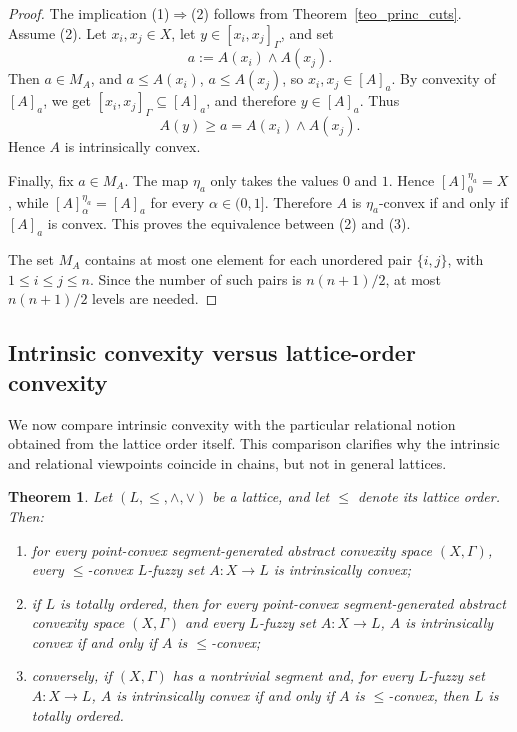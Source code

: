 \documentclass[11pt,a4paper]{article}
\newtheorem{theorem}{Theorem}
\begin{document}
\begin{proof}
The implication (1)\(\Rightarrow\)(2) follows from Theorem~\ref{teo_princ_cuts}. Assume (2). Let \(x_i,x_j\in X\), let \(y\in[x_i,x_j]_{\Gamma}\), and set
\begin{equation*}
a:=A(x_i)\wedge A(x_j).
\end{equation*}
Then \(a\in M_A\), and \(a\le A(x_i)\), \(a\le A(x_j)\), so \(x_i,x_j\in[A]_a\). By convexity of \([A]_a\), we get \([x_i,x_j]_{\Gamma}\subseteq[A]_a\), and therefore \(y\in[A]_a\). Thus
\begin{equation*}
A(y)\ge a=A(x_i)\wedge A(x_j).
\end{equation*}
Hence \(A\) is intrinsically convex.

Finally, fix \(a\in M_A\). The map \(\eta_a\) only takes the values \(0\) and \(1\). Hence \([A]^{\eta_a}_0=X\), while \([A]^{\eta_a}_\alpha=[A]_a\) for every \(\alpha\in(0,1]\). Therefore \(A\) is \(\eta_a\)-convex if and only if \([A]_a\) is convex. This proves the equivalence between (2) and (3).

The set \(M_A\) contains at most one element for each unordered pair \(\{i,j\}\), with \(1\le i\le j\le n\). Since the number of such pairs is \(n(n+1)/2\), at most \(n(n+1)/2\) levels are needed.
\end{proof}

\subsection{Intrinsic convexity versus lattice-order convexity}

\smallskip

We now compare intrinsic convexity with the particular relational notion obtained from the lattice order itself. This comparison clarifies why the intrinsic and relational viewpoints coincide in chains, but not in general lattices.

\begin{theorem}\label{teo_order_intrinsic}
Let \((L,\leq,\wedge,\vee)\) be a lattice, and let \(\leq\) denote its lattice order. Then:
\begin{enumerate}
    \item for every point-convex segment-generated abstract convexity space \((X,\Gamma)\), every \(\leq\)-convex \(L\)-fuzzy set \(A:X\to L\) is intrinsically convex;
    \item if \(L\) is totally ordered, then for every point-convex segment-generated abstract convexity space \((X,\Gamma)\) and every \(L\)-fuzzy set \(A:X\to L\), \(A\) is intrinsically convex if and only if \(A\) is \(\leq\)-convex;
    \item conversely, if \((X,\Gamma)\) has a nontrivial segment and, for every \(L\)-fuzzy set \(A:X\to L\), \(A\) is intrinsically convex if and only if \(A\) is \(\leq\)-convex, then \(L\) is totally ordered.
\end{enumerate}
\end{theorem}
\end{document}
